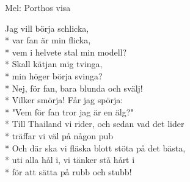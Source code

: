 \begin{SongText}
    \begin{SongInfo}
        Mel: Porthos visa
    \end{SongInfo}
    \begin{SongVerse}
        Jag vill börja schlicka, \\*%
        var fan är min flicka,\\*%
        vem i helvete stal min modell?\\*%
        Skall kätjan mig tvinga,\\*%
        min höger börja svinga?\\*%
        Nej, för fan, bara blunda och svälj!\\*%
        Vilker smörja! Får jag spörja:\\*%
        "Vem för fan tror jag är en älg?"\\*%
        Till Thailand vi rider, och sedan vad det lider\\*%
        träffar vi väl på någon pub\\*%
        Och där ska vi fläska blott stöta på det bästa,\\*%
        uti alla hål i, vi tänker stå hårt i\\*%
        för att sätta på rubb och stubb!
    \end{SongVerse}
\end{SongText}
